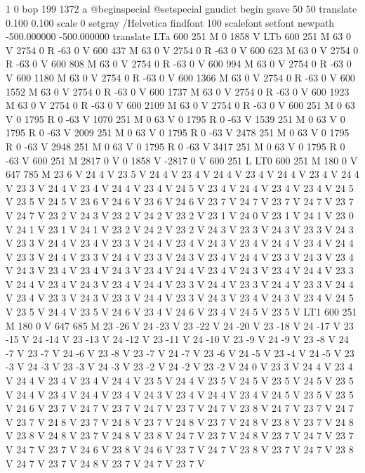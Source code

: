1 0 bop 199 1372 a @beginspecial @setspecial
 gnudict begin gsave 50 50 translate 0.100 0.100 scale 0 setgray /Helvetica
findfont 100 scalefont setfont newpath -500.000000 -500.000000 translate
LTa 600 251 M 0 1858 V LTb 600 251 M 63 0 V 2754 0 R -63 0 V 600 437
M 63 0 V 2754 0 R -63 0 V 600 623 M 63 0 V 2754 0 R -63 0 V 600 808
M 63 0 V 2754 0 R -63 0 V 600 994 M 63 0 V 2754 0 R -63 0 V 600 1180
M 63 0 V 2754 0 R -63 0 V 600 1366 M 63 0 V 2754 0 R -63 0 V 600 1552
M 63 0 V 2754 0 R -63 0 V 600 1737 M 63 0 V 2754 0 R -63 0 V 600 1923
M 63 0 V 2754 0 R -63 0 V 600 2109 M 63 0 V 2754 0 R -63 0 V 600 251
M 0 63 V 0 1795 R 0 -63 V 1070 251 M 0 63 V 0 1795 R 0 -63 V 1539 251
M 0 63 V 0 1795 R 0 -63 V 2009 251 M 0 63 V 0 1795 R 0 -63 V 2478 251
M 0 63 V 0 1795 R 0 -63 V 2948 251 M 0 63 V 0 1795 R 0 -63 V 3417 251
M 0 63 V 0 1795 R 0 -63 V 600 251 M 2817 0 V 0 1858 V -2817 0 V 600
251 L LT0 600 251 M 180 0 V 647 785 M 23 6 V 24 4 V 23 5 V 24 4 V 23
4 V 24 4 V 23 4 V 24 4 V 23 4 V 24 4 V 23 3 V 24 4 V 23 4 V 24 4 V
23 4 V 24 5 V 23 4 V 24 4 V 23 4 V 23 4 V 24 5 V 23 5 V 24 5 V 23 6
V 24 6 V 23 6 V 24 6 V 23 7 V 24 7 V 23 7 V 24 7 V 23 7 V 24 7 V 23
2 V 24 3 V 23 2 V 24 2 V 23 2 V 23 1 V 24 0 V 23 1 V 24 1 V 23 0 V
24 1 V 23 1 V 24 1 V 23 2 V 24 2 V 23 2 V 24 3 V 23 3 V 24 3 V 23 3
V 24 3 V 23 3 V 24 4 V 23 4 V 23 3 V 24 4 V 23 4 V 24 3 V 23 4 V 24
4 V 23 4 V 24 4 V 23 3 V 24 4 V 23 3 V 24 4 V 23 3 V 24 3 V 23 4 V
24 4 V 23 3 V 24 3 V 23 4 V 24 3 V 23 4 V 23 4 V 24 3 V 23 4 V 24 4
V 23 4 V 24 3 V 23 4 V 24 4 V 23 3 V 24 4 V 23 4 V 24 3 V 23 4 V 24
4 V 23 3 V 24 4 V 23 3 V 24 4 V 23 3 V 24 4 V 23 4 V 23 3 V 24 3 V
23 3 V 24 4 V 23 3 V 24 3 V 23 4 V 24 3 V 23 4 V 24 5 V 23 5 V 24 4
V 23 5 V 24 6 V 23 4 V 24 6 V 23 4 V 24 5 V 23 5 V LT1 600 251 M 180
0 V 647 685 M 23 -26 V 24 -23 V 23 -22 V 24 -20 V 23 -18 V 24 -17 V
23 -15 V 24 -14 V 23 -13 V 24 -12 V 23 -11 V 24 -10 V 23 -9 V 24 -9
V 23 -8 V 24 -7 V 23 -7 V 24 -6 V 23 -8 V 23 -7 V 24 -7 V 23 -6 V 24
-5 V 23 -4 V 24 -5 V 23 -3 V 24 -3 V 23 -3 V 24 -3 V 23 -2 V 24 -2
V 23 -2 V 24 0 V 23 3 V 24 4 V 23 4 V 24 4 V 23 4 V 23 4 V 24 4 V 23
5 V 24 4 V 23 5 V 24 5 V 23 5 V 24 5 V 23 5 V 24 4 V 23 4 V 24 4 V
23 4 V 24 3 V 23 4 V 24 4 V 23 4 V 24 5 V 23 5 V 23 5 V 24 6 V 23 7
V 24 7 V 23 7 V 24 7 V 23 7 V 24 7 V 23 8 V 24 7 V 23 7 V 24 7 V 23
7 V 24 8 V 23 7 V 24 8 V 23 7 V 24 8 V 23 7 V 24 8 V 23 8 V 23 7 V
24 8 V 23 8 V 24 8 V 23 7 V 24 8 V 23 8 V 24 7 V 23 7 V 24 8 V 23 7
V 24 7 V 23 7 V 24 7 V 23 7 V 24 6 V 23 8 V 24 6 V 23 7 V 24 7 V 23
8 V 23 7 V 24 7 V 23 8 V 24 7 V 23 7 V 24 8 V 23 7 V 24 7 V 23 7 V

